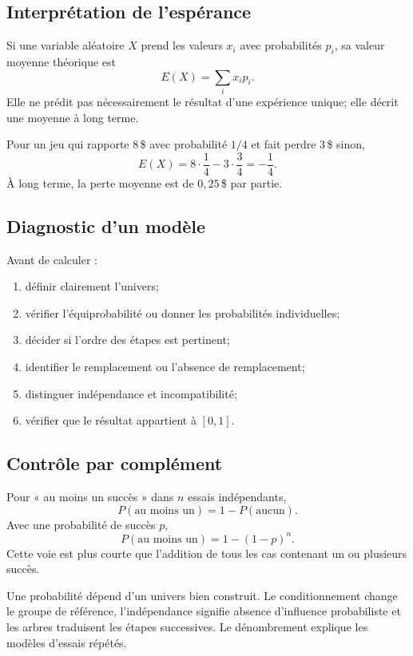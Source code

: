 \subsection{Interprétation de l'espérance}

Si une variable aléatoire $X$ prend les valeurs $x_i$ avec probabilités $p_i$, sa valeur moyenne théorique est
\[
E(X)=\sum_i x_ip_i.
\]
Elle ne prédit pas nécessairement le résultat d'une expérience unique; elle décrit une moyenne à long terme.

Pour un jeu qui rapporte $8\,$\$ avec probabilité $1/4$ et fait perdre $3\,$\$ sinon,
\[
E(X)=8\cdot\frac14-3\cdot\frac34=-\frac14.
\]
À long terme, la perte moyenne est de $0{,}25\,$\$ par partie.

\subsection{Diagnostic d'un modèle}

Avant de calculer :
\begin{enumerate}
\item définir clairement l'univers;
\item vérifier l'équiprobabilité ou donner les probabilités individuelles;
\item décider si l'ordre des étapes est pertinent;
\item identifier le remplacement ou l'absence de remplacement;
\item distinguer indépendance et incompatibilité;
\item vérifier que le résultat appartient à $[0,1]$.
\end{enumerate}

\subsection{Contrôle par complément}

Pour « au moins un succès » dans $n$ essais indépendants,
\[
P(\text{au moins un})=1-P(\text{aucun}).
\]
Avec une probabilité de succès $p$,
\[
P(\text{au moins un})=1-(1-p)^n.
\]
Cette voie est plus courte que l'addition de tous les cas contenant un ou plusieurs succès.

\begin{summarybox}
Une probabilité dépend d'un univers bien construit. Le conditionnement change le groupe de référence, l'indépendance signifie absence d'influence probabiliste et les arbres traduisent les étapes successives. Le dénombrement explique les modèles d'essais répétés.
\end{summarybox}
